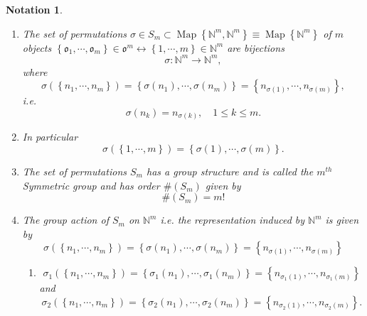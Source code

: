 \documentclass[aps,preprint]{revtex4}%
\newtheorem{notation}[theorem]{Notation}
\begin{document}
\begin{notation}
\begin{enumerate}
\item The set of permutations $\sigma\in S_{m}\subset\operatorname*{Map}%
\left\{  \mathbb{N}^{m},\mathbb{N}^{m}\right\}  \equiv\operatorname*{Map}%
\left\{  \mathbb{N}^{m}\right\}  $ of $m$ objects $\left\{  \mathfrak{o}%
_{1},\cdots,\mathfrak{o}_{m}\right\}  \in\mathfrak{o}^{m}\leftrightarrow
\left\{  1,\cdots,m\right\}  \in\mathbb{N}^{m}$ are bijections
\begin{equation}
\sigma:\mathbb{N}^{m}\rightarrow\mathbb{N}^{m},
\end{equation}
where
\begin{equation}
\sigma\left(  \left\{  n_{1},\cdots,n_{m}\right\}  \right)  =\left\{
\sigma\left(  n_{1}\right)  ,\cdots,\sigma\left(  n_{m}\right)  \right\}
=\left\{  n_{\sigma\left(  1\right)  },\cdots,n_{\sigma\left(  m\right)
}\right\}  ,
\end{equation}
i.e.%
\begin{equation}
\sigma\left(  n_{k}\right)  =n_{\sigma\left(  k\right)  },\quad1\leq k\leq m.
\end{equation}


\item In particular
\begin{equation}
\sigma\left(  \left\{  1,\cdots,m\right\}  \right)  =\left\{  \sigma\left(
1\right)  ,\cdots,\sigma\left(  m\right)  \right\}  .
\end{equation}


\item The set of permutations $S_{m}$ has a group structure and is called the
$m^{th}$ Symmetric group and has order $\#\left(  S_{m}\right)  $ given by
\begin{equation}
\#\left(  S_{m}\right)  =m!
\end{equation}


\item The \emph{group action} of $S_{m}$ on $\mathbb{N}^{m}$ i.e. the
representation induced by $\mathbb{N}^{m}$ is given by
\begin{equation}
\sigma\left(  \left\{  n_{1},\cdots,n_{m}\right\}  \right)  =\left\{
\sigma\left(  n_{1}\right)  ,\cdots,\sigma\left(  n_{m}\right)  \right\}
=\left\{  n_{\sigma\left(  1\right)  },\cdots,n_{\sigma\left(  m\right)
}\right\}
\end{equation}


\begin{enumerate}
\item
\begin{equation}
\sigma_{1}\left(  \left\{  n_{1},\cdots,n_{m}\right\}  \right)  =\left\{
\sigma_{1}\left(  n_{1}\right)  ,\cdots,\sigma_{1}\left(  n_{m}\right)
\right\}  =\left\{  n_{\sigma_{1}\left(  1\right)  },\cdots,n_{\sigma
_{1}\left(  m\right)  }\right\}
\end{equation}
and%
\begin{equation}
\sigma_{2}\left(  \left\{  n_{1},\cdots,n_{m}\right\}  \right)  =\left\{
\sigma_{2}\left(  n_{1}\right)  ,\cdots,\sigma_{2}\left(  n_{m}\right)
\right\}  =\left\{  n_{\sigma_{2}\left(  1\right)  },\cdots,n_{\sigma
_{2}\left(  m\right)  }\right\}  .
\end{equation}



\end{enumerate}
\end{enumerate}
\end{notation}
\end{document}
